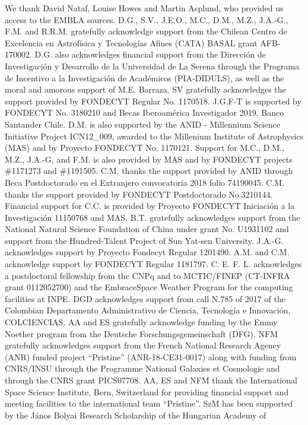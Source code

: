 \documentclass[onecolumn]{aa}
\begin{document}
\begin{acknowledgements}
We thank David Nataf, Louise Howes and Martin Asplund, who provided us access to the EMBLA sources.
D.G., S.V., J.E.O., M.C., D.M., M.Z., J.A.-G., F.M. and R.R.M. gratefully acknowledge support from the Chilean Centro de Excelencia en Astrof\'isica y Tecnolog\'ias Afines (CATA) BASAL grant AFB-170002.
D.G. also acknowledges financial support from the Dirección de Investigación y Desarrollo de
la Universidad de La Serena through the Programa de Incentivo a la Investigación de
Académicos (PIA-DIDULS), as well as the moral and amorous support of M.E. Barraza. SV gratefully acknowledges the support provided by FONDECYT Regular No. 1170518.
J.G.F-T is supported by FONDECYT No. 3180210 and Becas Iberoam\'erica Investigador 2019, Banco Santander Chile.
D.M. is also supported  by the ANID - Millennium Science Initiative Project ICN12\_009,
awarded to the Millenium Institute of Astrophysics (MAS) and by Proyecto FONDECYT No. 1170121.
Support for M.C., D.M., M.Z., J.A.-G, and F.M. is also provided by MAS and by FONDECYT projects \#1171273 and \#1191505.
C.M.  thanks the support  provided by ANID  through  Beca Postdoctorado en el Extranjero convocatoria 2018 folio 74190045.
C.M. thanks the support provided by  FONDECYT Postdoctorado No.3210144.
Financial support for C.C. is provided by Proyecto FONDECYT Iniciaci\'on a la Investigaci\'on 11150768 and MAS.
B.T. gratefully acknowledges support from the National Natural Science Foundation of China under grant No. U1931102 and support from the Hundred-Talent Project of Sun Yat-sen University.
J.A.-G. acknowledges support by Proyecto Fondecyt Regular 1201490. A.M. and C.M. acknowledge support by FONDECYT Regular 1181797.
C. E. F. L. acknowledges a postdoctoral fellowship from the CNPq and to MCTIC/FINEP (CT-INFRA grant 0112052700) and the EmbraceSpace Weather Program for the computing facilities at INPE.
DGD acknowledges support from call N.785 of 2017 of the Colombian Departamento Administrativo de Ciencia, Tecnolog\'ia e Innovaci\'on, COLCIENCIAS.
AA and ES gratefully acknowledge funding by the Emmy Noether program from the Deutsche Forschungsgemeinschaft (DFG). NFM gratefully acknowledges support from the French National Research Agency (ANR) funded project ``Pristine'' (ANR-18-CE31-0017) along with funding from CNRS/INSU through the Programme National Galaxies et Cosmologie and through the CNRS grant PICS07708. AA, ES and NFM thank the International Space Science Institute, Bern, Switzerland for providing financial support and meeting facilities to the international team ``Pristine''. 
SzM has been supported by the J{\'a}nos Bolyai Research Scholarship of the Hungarian Academy of

\end{acknowledgements}
\end{document}
